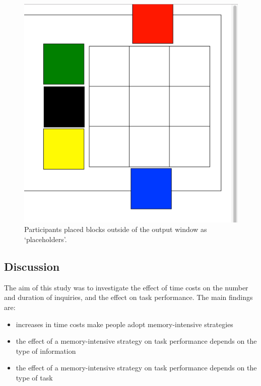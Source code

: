 \begin{figure}[t!]
\centering
\includegraphics[scale=0.3]{images/ch34/ch4_placeholders.pdf}
\caption[Study 3 placeholders]{Participants placed blocks outside of the output window as `placeholders'.}
\vspace{-9pt}
\label{fig:ch4_placeholders}
\end{figure}


\subsection{Discussion}
The aim of this study was to investigate the effect of time costs on the number and duration of inquiries, and the effect on task performance. The main findings are:

\begin{itemize}
\item
increases in time costs make people adopt memory-intensive strategies
\item
the effect of a memory-intensive strategy on task performance depends on the type of information
\item
the effect of a memory-intensive strategy on task performance depends on the type of task
\end{itemize}

